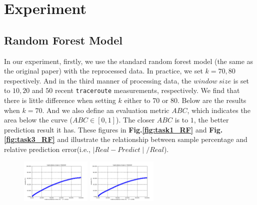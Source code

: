 \documentclass[sigconf]{acmart}
\begin{document}
	\section{Experiment}
	\subsection{Random Forest Model}
	In our experiment, firstly, we use the standard random forest model (the same as the original paper) with the reprocessed data.  In practice, we set $k = 70, 80$ respectively. And in the third manner of processing data, the $window\ size$ is set to $10,20$ and $50$ recent \texttt{traceroute} measurements, respectively. We find that there is little difference when setting $k$ either to 70 or 80. Below are the results when $k = 70$. And we also define an evaluation metric $ABC$, which indicates the  area below the curve ($ABC\in[0,1]$). The closer $ABC$ is to $1$, the better prediction result it has. These figures in \textbf{Fig.\ref{fig:task1_RF}} and \textbf{Fig.\ref{fig:task3_RF}} and  illustrate the relationship between sample percentage and relative prediction error(i.e., $\mid Real - Predict\mid/ Real $). 
	\begin{figure} [!htb] 
		\centering  
		\includegraphics[width=0.3\textwidth]{fig4/data-1-task-1-7030-RF.pdf}  
		\includegraphics[width=0.3\textwidth]{fig4/data-2-task-1-7030-RF.pdf} 
	\end{figure} 
\end{document}
